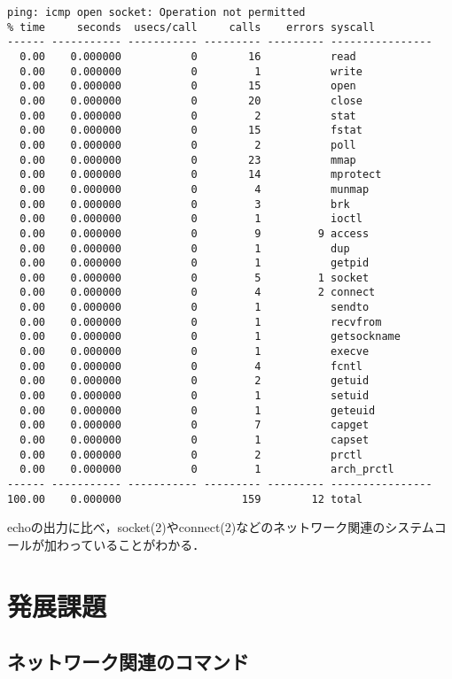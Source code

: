 \documentclass[a4j,10pt,titlepage]{jsarticle}
\begin{document}
\begin{verbatim}
ping: icmp open socket: Operation not permitted
% time     seconds  usecs/call     calls    errors syscall
------ ----------- ----------- --------- --------- ----------------
  0.00    0.000000           0        16           read
  0.00    0.000000           0         1           write
  0.00    0.000000           0        15           open
  0.00    0.000000           0        20           close
  0.00    0.000000           0         2           stat
  0.00    0.000000           0        15           fstat
  0.00    0.000000           0         2           poll
  0.00    0.000000           0        23           mmap
  0.00    0.000000           0        14           mprotect
  0.00    0.000000           0         4           munmap
  0.00    0.000000           0         3           brk
  0.00    0.000000           0         1           ioctl
  0.00    0.000000           0         9         9 access
  0.00    0.000000           0         1           dup
  0.00    0.000000           0         1           getpid
  0.00    0.000000           0         5         1 socket
  0.00    0.000000           0         4         2 connect
  0.00    0.000000           0         1           sendto
  0.00    0.000000           0         1           recvfrom
  0.00    0.000000           0         1           getsockname
  0.00    0.000000           0         1           execve
  0.00    0.000000           0         4           fcntl
  0.00    0.000000           0         2           getuid
  0.00    0.000000           0         1           setuid
  0.00    0.000000           0         1           geteuid
  0.00    0.000000           0         7           capget
  0.00    0.000000           0         1           capset
  0.00    0.000000           0         2           prctl
  0.00    0.000000           0         1           arch_prctl
------ ----------- ----------- --------- --------- ----------------
100.00    0.000000                   159        12 total
\end{verbatim}

echoの出力に比べ，socket(2)やconnect(2)などのネットワーク関連のシステムコールが加わっていることがわかる．

\section{発展課題}
\subsection{ネットワーク関連のコマンド}
\end{document}
